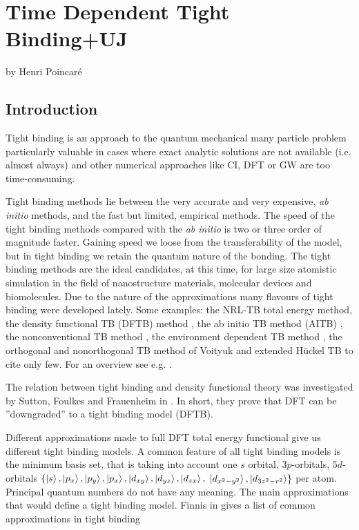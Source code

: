 \chapter{Time Dependent Tight Binding+UJ}
\label{ch:one}
%
{by Henri Poincar\'e}
%
\section{Introduction}
\par{Tight binding is an approach to the quantum mechanical many particle problem particularly valuable in cases
where exact analytic solutions are not available (i.e. almost always) and other numerical approaches
like CI, DFT or GW are too time-consuming.}
\par{Tight binding methods lie between the very accurate and very expensive,
\emph{ab initio} methods, and the fast but limited, empirical methods. The
speed of the tight binding methods compared with the \emph{ab initio} is two
or three order of magnitude faster. Gaining speed we loose from the
transferability of the model, but in tight binding we retain the quantum
nature of the bonding. The tight binding methods are the ideal candidates, at
this time, for large size atomistic simulation in the field of nanostructure materials, molecular devices and biomolecules. Due to the nature of the approximations many flavours of tight binding were developed lately. Some examples: the NRL-TB total energy method\citep{Mehl96}, the density functional TB (DFTB) method \citep{Frauenheim00,Elstner98,Elstner07,Seifert07}, the ab initio TB method (AITB) \citep{Sankey89, Horsfield97, Tu06}, the nonconventional TB method \citep{Khakimov05}, the environment dependent TB method \citep{Tang96}, the orthogonal and nonorthogonal TB method of Voityuk \citep{Voityuk06,Voityuk06b} and extended H\"{u}ckel TB\citep{Rincon08} to cite only few. For an overview see e.g. \citep{Finnis03,Goringe97b}.}
\par{The relation between tight binding and density functional theory was
  investigated by Sutton, Foulkes and Frauenheim in \citep{Sutton88,Foulkes89,Frauenheim00}. In short, they
  prove that DFT can be ''downgraded'' to a tight binding model (DFTB).}
\par{Different approximations made to full DFT total energy functional give us
different tight binding models. A common feature of all tight binding models
is the minimum basis set, that is taking into account  one $s$ orbital,
$3p$-orbitals, $5d$-orbitals
$\{\mathinner{|{s}\rangle},\mathinner{|{p_x}\rangle},\mathinner{|{p_y}\rangle},\mathinner{|{p_x}\rangle},\mathinner{|{d_{xy}}\rangle},\mathinner{|{d_{yz}}\rangle},\mathinner{|{d_{zx}}\rangle},$
$\mathinner{|{d_{x^2-y^2}}\rangle},\mathinner{|{d_{3z^2-r^2}}\rangle}\}$
per atom. Principal quantum numbers do not have any meaning. The main
approximations that would define a tight binding model. Finnis in \citep{Finnis03} gives a list of common  approximations in tight binding} 
